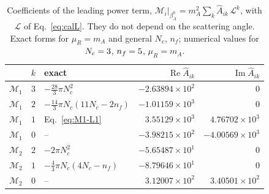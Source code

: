 \begin{table}[!htb]
\centering

\begin{tabular}{cclrr}
\toprule
 & $k$ & exact & $\operatorname{Re}\widehat A_{ik}$ & $\operatorname{Im}\widehat A_{ik}$ \\
\midrule
$\mathcal M_1$ & $3$ & $-\tfrac{28}{3}\pi N_c^2$ & $-2.63894\times10^{2}$ & $0$ \\
$\mathcal M_1$ & $2$ & $-\tfrac{14}{3}\pi N_c(11N_c-2n_f)$ & $-1.01159\times10^{3}$ & $0$ \\
$\mathcal M_1$ & $1$ & Eq.~\eqref{eq:M1-L1} & $3.55129\times10^{3}$ & $4.76702\times10^{3}$ \\
$\mathcal M_1$ & $0$ & -- & $-3.98215\times10^{2}$ & $-4.00569\times10^{3}$ \\
$\mathcal M_2$ & $2$ & $-2\pi N_c^2$ & $-5.65487\times10^{1}$ & $0$ \\
$\mathcal M_2$ & $1$ & $-\tfrac{4}{3}\pi N_c(4N_c-n_f)$ & $-8.79646\times10^{1}$ & $0$ \\
$\mathcal M_2$ & $0$ & -- & $3.12007\times10^{2}$ & $3.40501\times10^{2}$ \\
\bottomrule
\end{tabular}
\caption{Coefficients of the leading power term, $\mathcal M_i|_{\beta_A^0}=m_A^2\sum_k \widehat A_{ik}\,\mathcal L^k$, with $\mathcal L$ of Eq.~\eqref{eq:calL}. They do not depend on the scattering angle. Exact forms for $\mu_R=m_A$ and general $N_c$, $n_f$; numerical values for $N_c=3$, $n_f=5$, $\mu_R=m_A$.}
\label{tab:leading-log-benchmark}
\end{table}
